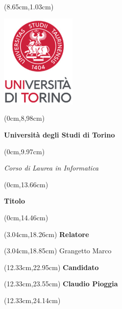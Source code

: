 \documentclass[a4paper,twoside,11pt]{book}
\begin{document}
\thispagestyle{empty}

\begingroup

\begin{textblock*}{4cm}(8.65cm,1.03cm)
	\centerline {\includegraphics[width=3.67cm]{images/LogoUniToConvertito.jpg}}
\end{textblock*}


\begin{textblock*}{21cm}(0cm,8,98cm)
	\fontsize{18}{22}\selectfont
	\centerline {\textbf{ Universit\`a degli Studi di Torino}}
\end{textblock*}
\begin{textblock*}{21cm}(0cm,9.97cm)
	\fontsize{18}{22}\selectfont
	\centerline {\textit{ Corso di Laurea in Informatica}}
\end{textblock*}


\begin{textblock*}{21cm}(0cm,13.66cm)
	\fontsize{20}{24}\selectfont
	\centerline  {\textbf{Titolo}}
\end{textblock*}
\begin{textblock*}{21cm}(0cm,14.46cm)
	\fontsize{18}{22}\selectfont
\end{textblock*}



\fontsize{14}{17}\selectfont

\begin{textblock*}{8cm}(3.04cm,18.26cm)
	\noindent 
	\textbf{Relatore}
\end{textblock*}
\begin{textblock*}{8cm}(3.04cm,18.85cm)
	\noindent 
	Grangetto Marco
\end{textblock*}

\begin{textblock*}{8cm}(12.33cm,22.95cm)
	\noindent
	\textbf{Candidato}
\end{textblock*}
\begin{textblock*}{8cm}(12.33cm,23.55cm)
	\noindent	\textbf{Claudio Pioggia}
\end{textblock*}
\begin{textblock*}{8cm}(12.33cm,24.14cm)
\end{textblock*}
\end{document}
